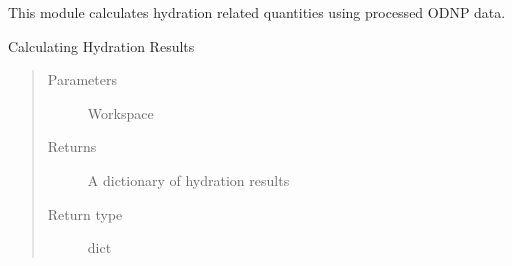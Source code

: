 \documentclass[letterpaper,10pt,english]{sphinxmanual}
\begin{document}
This module calculates hydration related quantities using processed ODNP data.

\begin{fulllineitems}
\label{\detokenize{dnpHydration:dnpLab.dnpHydration.hydration}}
Calculating Hydration Results
\begin{quote}\begin{description}
\item[{Parameters}] \leavevmode
{} \sphinxhyphen{}\sphinxhyphen{} Workspace

\item[{Returns}] \leavevmode
A dictionary of hydration results

\item[{Return type}] \leavevmode
dict

\end{description}\end{quote}

\end{fulllineitems}

\end{document}
